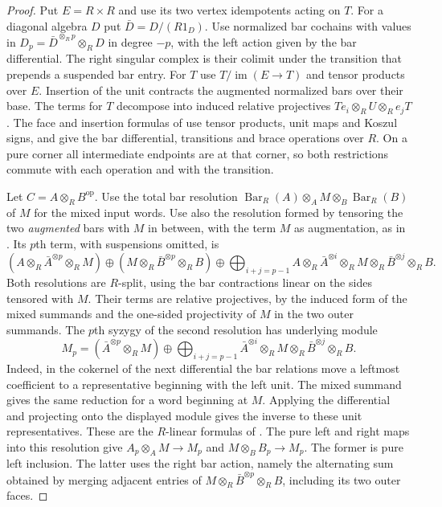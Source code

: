 \documentclass[12pt,a4paper,english,reqno]{amsart}
\numberwithin{equation}{section}
\theoremstyle{plain}
\theoremstyle{definition}
\begin{document}
\begin{proof}
Put $E=R\times R$ and use its two vertex idempotents acting
on $T$. For a diagonal algebra $D$ put $\bar D=D/(R1_D)$.
Use normalized bar cochains with values in
$D_p=\bar D^{\otimes_R p}\otimes_R D$ in degree $-p$,
with the left action given by the bar differential. The right
singular complex is their colimit under the transition
that prepends a suspended bar entry. For $T$ use
$T/\operatorname{im}(E\to T)$ and tensor products over $E$.
Insertion of the unit contracts the augmented normalized bars
over their base. The terms for $T$ decompose into induced
relative projectives $Te_i\otimes_R U\otimes_R e_jT$.
The face and insertion formulas of
\cite[Section~8.1]{ChenLiWangBInfinity} use tensor products,
unit maps and Koszul signs, and give the bar differential,
transitions and brace operations over $R$. On a pure
corner all intermediate endpoints are at that corner, so both
restrictions commute with each operation and with the transition.

Let $C=A\otimes_R B^{\mathrm{op}}$. Use the total bar
resolution $\operatorname{Bar}_R(A)\otimes_A M
\otimes_B\operatorname{Bar}_R(B)$ of $M$ for the mixed input
words. Use also the resolution formed by tensoring the two
\emph{augmented} bars with $M$ in between, with the term $M$
as augmentation, as in \cite[Section~9.3]{ChenLiWangBInfinity}.
Its $p$th term, with suspensions omitted, is
\[
 (A\otimes_R\bar A^{\otimes p}\otimes_R M)
 \oplus (M\otimes_R\bar B^{\otimes p}\otimes_R B)
 \oplus\bigoplus_{i+j=p-1}
 A\otimes_R\bar A^{\otimes i}\otimes_R M
     \otimes_R\bar B^{\otimes j}\otimes_R B.
\]
Both resolutions are $R$-split, using the bar contractions
linear on the sides tensored with $M$. Their terms are
relative projectives, by the induced form of the mixed
summands and the one-sided projectivity of $M$ in the two
outer summands. The $p$th syzygy of the second resolution
has underlying module
\[
 M_p=(\bar A^{\otimes p}\otimes_R M)
 \oplus\bigoplus_{i+j=p-1}
       \bar A^{\otimes i}\otimes_R M\otimes_R
                          \bar B^{\otimes j}\otimes_R B.
\]
Indeed, in the cokernel of the next differential the bar
relations move a leftmost coefficient to a representative
beginning with the left unit. The mixed summand gives the
same reduction for a word beginning at $M$. Applying the
differential and projecting onto the displayed module gives
the inverse to these unit representatives. These are the
$R$-linear formulas of
\cite[Lemma~9.8 and eqs.~(9.9)--(9.10)]{ChenLiWangBInfinity}.
The pure left and right maps into this resolution give
$A_p\otimes_A M\to M_p$ and $M\otimes_B B_p\to M_p$.
The former is pure left inclusion. The latter uses the right
bar action, namely the alternating sum obtained by merging
adjacent entries of $M\otimes_R\bar B^{\otimes p}\otimes_R B$,
including its two outer faces.


\end{proof}
\end{document}
